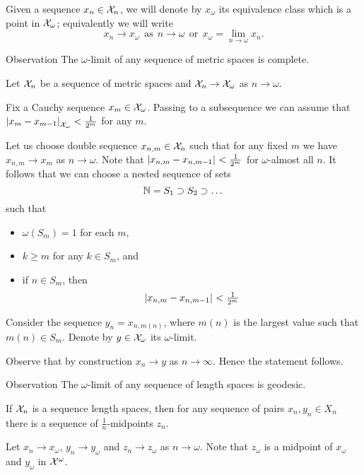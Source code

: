 Given a sequence $x_n\in \mathcal{X}_n$,
we will denote by $x_\omega$ its equivalence class which is a point in $\mathcal{X}_\omega$;
equivalently we will write
\[x_n\to x_\omega \ \ \text{as}\ \  n\to\omega\ \ \text{or}\ \ x_\omega=\lim_{n\to\omega} x_n.\]

\begin{thm}{Observation}\label{obs:ultralimit-is-complete}
The $\omega$-limit of any sequence of metric spaces is complete. 
\end{thm}

Let $\mathcal{X}_n$ be a sequence of metric spaces and $\mathcal{X}_n\to\mathcal{X}_\omega$ as $n\to\omega$.

Fix a Cauchy sequence $x_{m}\in \mathcal{X}_\omega$.
Passing to a subsequence we can assume that $\dist{x_m}{x_{m-1}}{\spc{X}_\omega}<\tfrac1{2^m}$ for any $m$.

Let us choose double sequence $x_{n,m}\in \mathcal{X}_n$ such that for any fixed $m$ we have $x_{n,m}\to x_m$ as $n\to\omega$.
Note that $\dist{x_{n,m}}{x_{n,m-1}}{}<\tfrac1{2^m}$ for $\omega$-almost all $n$.
It follows that we can choose a nested sequence of sets 
\[\mathbb{N}= S_1\supset S_2\supset\dots\] 
such that 
\begin{itemize}
\item $\omega(S_m)=1$ for each $m$, 
\item $k\ge m$ for any $k\in S_m$, and
\item if $n\in S_m$, then 
\[\dist{x_{n,m}}{x_{n,m-1}}{}<\tfrac1{2^m}\]
\end{itemize}

Consider the sequence $y_n=x_{n,m(n)}$, where $m(n)$ is the largest value such that $m(n)\in S_{m}$.
Denote by $y\in \mathcal{X}_\omega$ its $\omega$-limit.

Observe that by construction $x_n\to y$ as $n\to \infty$.
Hence the statement follows.
\qeds

\begin{thm}{Observation}\label{obs:ultralimit-is-geodesic}
The $\omega$-limit of any sequence of length spaces is geodesic. 
\end{thm}

If $\mathcal{X}_n$ is a sequence length spaces, then for any sequence of pairs $x_n, y_n\in X_n$ there is a sequence of $\tfrac1n$-midpoints $z_n$.

Let $x_n\to x_\omega$, $y_n\to y_\omega$ and $z_n\to z_\omega$ as $n\to \omega$.
Note that $z_\omega$ is a midpoint of $x_\omega$ and $y_\omega$ in $\mathcal{X}^\omega$.

